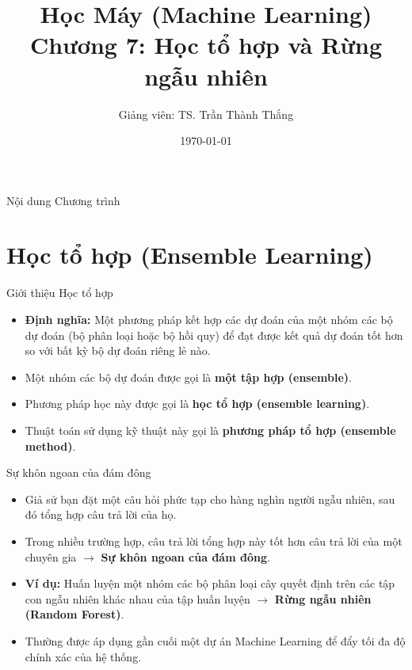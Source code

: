\documentclass[aspectratio=169]{beamer}
\title[Chương 7: Học tổ hợp \& Rừng ngẫu nhiên]{Học Máy (Machine Learning)\\Chương 7: Học tổ hợp và Rừng ngẫu nhiên}
\author{Giảng viên: TS. Trần Thành Thắng}
\institute{Đại học Đông Á}
\date{\today}
\begin{document}
\begin{frame}
    \titlepage
\end{frame}

\begin{frame}{Nội dung Chương trình}
    \tableofcontents
\end{frame}

\section{Học tổ hợp (Ensemble Learning)}
\begin{frame}{Giới thiệu Học tổ hợp}
    \begin{itemize}
        \item \textbf{Định nghĩa:} Một phương pháp kết hợp các dự đoán của một nhóm các bộ dự đoán (bộ phân loại hoặc bộ hồi quy) để đạt được kết quả dự đoán tốt hơn so với bất kỳ bộ dự đoán riêng lẻ nào.
        \item Một nhóm các bộ dự đoán được gọi là \textbf{một tập hợp (ensemble)}.
        \item Phương pháp học này được gọi là \textbf{học tổ hợp (ensemble learning)}.
        \item Thuật toán sử dụng kỹ thuật này gọi là \textbf{phương pháp tổ hợp (ensemble method)}.
    \end{itemize}
\end{frame}

\begin{frame}{Sự khôn ngoan của đám đông}
    \begin{itemize}
        \item Giả sử bạn đặt một câu hỏi phức tạp cho hàng nghìn người ngẫu nhiên, sau đó tổng hợp câu trả lời của họ.
        \item Trong nhiều trường hợp, câu trả lời tổng hợp này tốt hơn câu trả lời của một chuyên gia $\rightarrow$ \textbf{Sự khôn ngoan của đám đông}.
        \item \textbf{Ví dụ:} Huấn luyện một nhóm các bộ phân loại cây quyết định trên các tập con ngẫu nhiên khác nhau của tập huấn luyện $\rightarrow$ \textbf{Rừng ngẫu nhiên (Random Forest)}.
        \item Thường được áp dụng gần cuối một dự án Machine Learning để đẩy tối đa độ chính xác của hệ thống.
    \end{itemize}
\end{frame}
\end{document}
